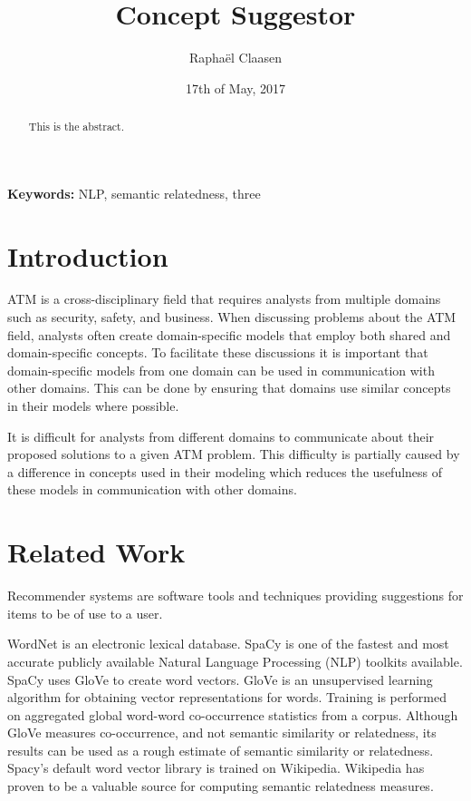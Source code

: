 \documentclass{article}
\title{Concept Suggestor}
\date{17th of May, 2017}
\author{Rapha\"el Claasen}
\begin{document}
\maketitle

\begin{abstract}
This is the abstract.
\end{abstract}

{\bf Keywords:} NLP, semantic relatedness, three

\section{Introduction}

ATM is a cross-disciplinary field that requires analysts from multiple domains such as security, safety, and business. When discussing problems about the ATM field, analysts often create domain-specific models that employ both shared and domain-specific concepts. To facilitate these discussions it is important that domain-specific models from one domain can be used in communication with other domains. This can be done by ensuring that domains use similar concepts in their models where possible.

It is difficult for analysts from different domains to communicate about their proposed solutions to a given ATM problem. This difficulty is partially caused by a difference in concepts used in their modeling which reduces the usefulness of these models in communication with other domains.

\section{Related Work}

Recommender systems are software tools and techniques providing suggestions for items to be of use to a user.\cite{ricci2011introduction}

WordNet is an electronic lexical database.\cite{kilgarriff2000wordnet}
SpaCy is one of the fastest and most accurate publicly available Natural Language Processing (NLP) toolkits available.\cite{choi2015depends}
SpaCy uses GloVe to create word vectors. GloVe is an unsupervised learning algorithm for obtaining vector representations for words. Training is performed on aggregated global word-word co-occurrence statistics from a corpus.\cite{pennington2014glove} Although GloVe measures co-occurrence, and not semantic similarity or relatedness, its results can be used as a rough estimate of semantic similarity or relatedness.\cite{levy2015improving} Spacy's default word vector library is trained on Wikipedia. Wikipedia has proven to be a valuable source for computing semantic relatedness measures.\cite{strube2006wikirelate}
\end{document}
